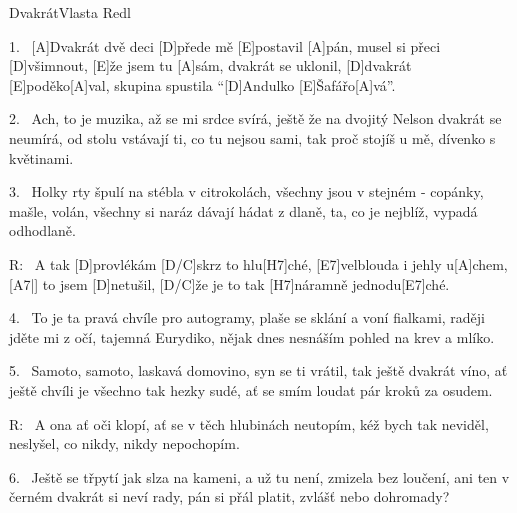 \begin{song}{Dvakrát}{Vlasta Redl}

\begin{xverse}{1.~}
[A]Dvakrát dvě deci [D]přede mě [E]postavil [A]pán,
musel si přeci [D]všimnout, [E]{že} jsem tu [A]sám,
dvakrát se uklonil, [D]dvakrát [E]poděko[A]val,
skupina spustila ``[D]Andulko [E]{Ša}fářo[A]vá''.
\end{xverse}

\begin{xverse}{2.~}
Ach, to je muzika, až se mi srdce svírá,
ještě že na dvojitý Nelson dvakrát se neumírá,
od stolu vstávají ti, co tu nejsou sami,
tak proč stojíš u mě, dívenko s květinami.
\end{xverse}

\begin{xverse}{3.~}
Holky rty špulí na stébla v citrokolách,
všechny jsou v stejném - copánky, mašle, volán,
všechny si naráz dávají hádat z dlaně,
ta, co je nejblíž, vypadá odhodlaně.
\end{xverse}

\begin{xverse}{R:~}
A tak [D]provlékám [D/C]skrz to hlu[H7]ché,
[E7]velblouda i jehly u[A]chem, [A7|]{}
to jsem [D]netušil, [D/C]{že} je to tak
[H7]náramně jednodu[E7]ché.
\end{xverse}

\begin{xverse}{4.~}
To je ta pravá chvíle pro autogramy,
plaše se sklání a voní fialkami,
raději jděte mi z očí, tajemná Eurydiko,
nějak dnes nesnáším pohled na krev a mlíko.
\end{xverse}

\begin{xverse}{5.~}
Samoto, samoto, laskavá domovino,
syn se ti vrátil, tak ještě dvakrát víno,
ať ještě chvíli je všechno tak hezky sudé,
ať se smím loudat pár kroků za osudem.
\end{xverse}

\begin{xverse}{R:~}
A ona ať oči klopí,
ať se v těch hlubinách neutopím,
kéž bych tak neviděl, neslyšel,
co nikdy, nikdy nepochopím.
\end{xverse}

\begin{xverse}{6.~}
Ještě se třpytí jak slza na kameni,
a už tu není, zmizela bez loučení,
ani ten v černém dvakrát si neví rady,
pán si přál platit, zvlášť nebo dohromady?
\end{xverse}

\end{song}


